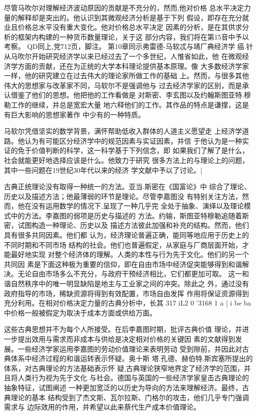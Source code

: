 尽管马吹尔对理解经济波动原因的贡献是不充分的，然而,他对价格
总水平决定力量的解释却是突出的。他认识到其微观经济分析是基于下列
假设，即存在充分就业且价格总水平没有重大变化。他对价格总水平决定
因素的分析，是在其供求分析的框架内构建的一种货币数量理论，关于这
部分内容，我们将在第15音中予以考察。
QD同上,党712页，脚注。
第10章同示弗雷德-马软忒与靖厂典经济学
癌.针
从马吹尔开始研究经济学以来已经过去了一个多世纪，人惟省如此，他
在微观经济学方面的贡献，还在为正统的大学本科理论提供基本原理。像
大多数经济学家一样，他的研究建立在过去伟大的理论家所做工作的基础
上。然而，与很多其他伟大的思想家与改革家不同，马软尔不是强调他与
过去经济学家的区别，而是承认借鉴了他们的思想。他把他的工作看做是
对斯密、李玄图以及约翰斯图亚特.穆勒工作的继续，并总是宽宏大量
地六释他们的工作。其作品的特点是谦撑，这是有巨大影响的思想家著作
中少有的一种特质。

马软尔凭借坚实的数学背景，满怀帮助低收入群体的人道主义愿望走
上经济学道路。他认为有可能区分经济学中的规范因素与实证因素，并信
于他认为是一种实证的免于价值判断的科学，这一科学基于下列信念，即
如果我们了解了是什么，社会就能更好地选择应该是什么。他致力于研究
很多方法上的与理论上的问题，其中一些问题在19世纪30年代以来的经济
学文献中予以了讨论。|

古典正统理论没有取得一种统一的方法。亚当.斯密在《国富论》中
综合了理论、历史以及描述方法；他最薄弱的环节是理论。尽管李嘉图没
有特别关注方法，然而，他在没有运用数学的情况下,呈现了一种几乎完
全处于抽象、演绎以及理论模式中的方法。李嘉图的弱项是历史与描述的
方法。约输，斯图亚特穆勒追随着斯密，试图构造一种理论、历史以及
描述方法彼此加强和补充的结构。然而，他们具有很多共同因素。他们都
认为，经济理论普遍正确，能同等地应用于历史上的不同时期和不同市场
结构的社会。他们也普遍假定，从家庭与厂商层面开始，才能最好地实现
对整个经济体的理解。人类的本性与行为先于文化。他们的另一个共同因
素是下面这种极为重要的信仰，即在自由市场中经济促突能够得到和谐解
决。无论自由市场多么不充分，与政府干预经济相比，它们都更加可取。
这一和谐自然秩序中的唯一明显缺陷是地主与工业家之间的冲突。除此之
外，通过没有政府指导的市场，稀缺资源将得到有效配置，市场自由发挥
作用将保证资源得到充分利用。在相对价格决定力量的古典分析中，长其
317
iL2
0
'3168
1
a
|
i
be
ba
中价格一般被假定为取决于成本方面或供给万面。

这些古典思想并不为每个人所接受。在后李嘉图时期，批评古典价值
理论，并进一步提出效用与需求而非成本与供给是决定相对价格的关键因
素的文献得到发展。一些经济学家运用李嘉图的劳动价值理论来表明劳动
受到隙前，并因此对古典体系中经济过程的和谐运转表示怀疑。奥十斯
塔.孔德、赫伯特.斯宾塞所提出的体系，对古典理论的方法基础表示怀
疑,古典理论狭窄地界定了经济学的范围，并且将人类行为视为先于文化
与社会。德国与英国的一些经济学家皇击古典理论的抽象特征，试图阐述
一种更加宽泛的以历史为导向的方法来理解经济。最终，古典理论的基本
结构受到了杰文斯、瓦尔拉斯、门格尔的攻击，他们几乎专门强调需求与
边际效用的作用，并希望以此来蔡代生产成本价值理论。

